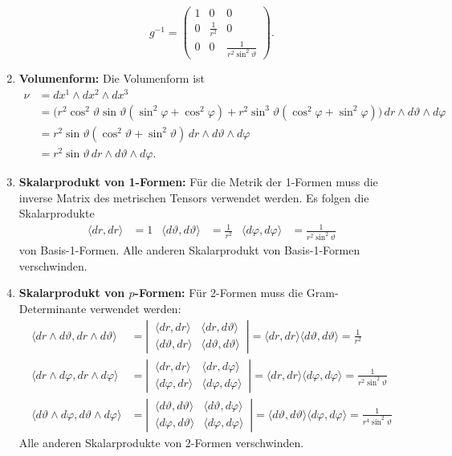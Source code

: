 \begin{enumerate}
\[
g^{-1}
=
\begin{pmatrix}
1 & 0 & 0 \\
0 & \frac1{r^2} & 0 \\
0 & 0 & \frac{1}{r^2\sin^2\vartheta}
\end{pmatrix}.
\]
\item {\bf Volumenform:}
Die Volumenform ist
\begin{align*}
\nu
&=
dx^1\wedge dx^2 \wedge dx^3
\\
&=
\bigl(
r^2 \cos^2\vartheta \sin\vartheta (\sin^2\varphi+\cos^2\varphi)
+
r^2 \sin^3\vartheta (\cos^2\varphi +\sin^2\varphi)
\bigr)\,
dr\wedge d\vartheta \wedge d\varphi
\\
&=
r^2 \sin\vartheta
(
\cos^2\vartheta
+
\sin^2\vartheta
)
\,dr\wedge d\vartheta \wedge d\varphi
\\
&=
r^2 \sin\vartheta\, dr\wedge d\vartheta\wedge d\varphi.
\end{align*}
\item {\bf Skalarprodukt von 1-Formen:}
Für die Metrik der 1-Formen muss die inverse Matrix
des metrischen Tensors verwendet werden.
Es folgen die Skalarprodukte
\begin{align*}
\langle dr,dr\rangle &= 1
&
\langle d\vartheta,d\vartheta\rangle &= \frac{1}{r^2}
&
\langle d\varphi,d\varphi\rangle &= \frac{1}{r^2\sin^2\vartheta}
\end{align*}
von Basis-1-Formen.
Alle anderen Skalarprodukt von Basis-1-Formen verschwinden.

\item {\bf Skalarprodukt von $p$-Formen:}
Für 2-Formen muss die Gram-Determinante verwendet werden:
\begin{align*}
\langle dr\wedge d\vartheta , dr\wedge d\vartheta \rangle
&=
\left|\,\begin{matrix}
\langle dr, dr \rangle        & \langle dr,d\vartheta \rangle \\
\langle d\vartheta,dr \rangle & \langle d\vartheta, d\vartheta \rangle
\end{matrix}\,\right|
=
\langle dr, dr \rangle \langle d\vartheta, d\vartheta \rangle
=
\frac1{r^2}
\\
\langle dr\wedge d\varphi , dr\wedge d\varphi \rangle
&=
\left|\,\begin{matrix}
\langle dr, dr \rangle      & \langle dr,d\varphi \rangle \\
\langle d\varphi,dr \rangle & \langle d\varphi, d\varphi \rangle
\end{matrix}\,\right|
=
\langle dr, dr \rangle \langle d\varphi, d\varphi \rangle
=
\frac1{r^2\sin^2\vartheta}
\\
\langle d\vartheta\wedge d\varphi , d\vartheta\wedge d\varphi \rangle
&=
\left|\,\begin{matrix}
\langle d\vartheta, d\vartheta \rangle
	& \langle d\vartheta,d\varphi \rangle \\
\langle d\varphi,d\vartheta \rangle
	& \langle d\varphi, d\varphi \rangle
\end{matrix}\,\right|
=
\langle d\vartheta, d\vartheta \rangle \langle d\varphi, d\varphi \rangle
=
\frac1{r^4\sin^2\vartheta}
\end{align*}
Alle anderen Skalarprodukte von 2-Formen verschwinden.


\end{enumerate}
